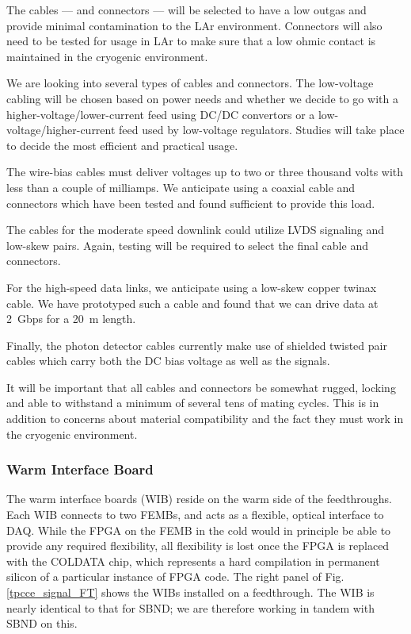 The cables --- and connectors --- will be selected to have a low outgas and provide minimal contamination to the LAr environment.
Connectors will also need to be tested for usage in LAr to make sure that a low ohmic contact is maintained
in the cryogenic environment.

We are looking into several types of cables and connectors.
The low-voltage cabling will be %
chosen based on power needs and whether we decide to go with a higher-voltage/lower-current
feed using DC/DC convertors or a low-voltage/higher-current feed used by low-voltage regulators.
Studies will take place to decide the most efficient and practical usage.

The wire-bias cables must deliver voltages up to %
two or three thousand volts with less than a couple of milliamps.
We anticipate using a coaxial cable and connectors which have been tested and found sufficient to provide this load.

The cables for the moderate speed downlink could utilize LVDS signaling and low-skew pairs.
Again, testing will be required to select the final cable and connectors.

For the high-speed data links, we anticipate using a low-skew copper twinax cable.
We have prototyped such a cable and found that we can drive data at 2~Gbps for a 20~m length.

Finally, the photon detector cables currently make use of shielded twisted pair cables which carry both
the DC bias voltage as well as the signals.

It will be important that all cables and connectors be somewhat rugged,
locking and able to withstand a minimum of several tens of mating cycles.
This is in addition to concerns about material compatibility and the fact they must work in the cryogenic environment.

%
\subsubsection{Warm Interface Board}
\label{subsubsec:ce_feedthrough_wib}
The warm interface boards (WIB) reside on the warm side of the feedthroughs.
Each WIB connects to two FEMBs, and acts as a flexible, optical interface to DAQ.
While the FPGA on the FEMB in the cold would in principle be able to provide any required flexibility,
all flexibility is lost once the FPGA is replaced with the COLDATA chip,
which represents a hard compilation in permanent silicon of a particular instance of FPGA code.
The right panel of Fig. \ref{tpcce_signal_FT} shows the WIBs installed on a feedthrough.
The WIB is nearly identical to that for SBND; we are therefore working in tandem with SBND on this.

